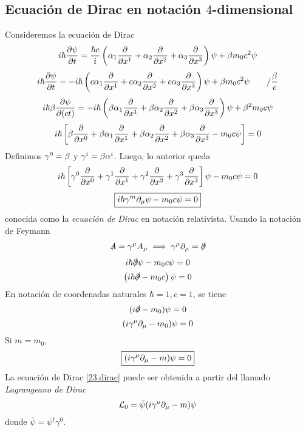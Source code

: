 \subsection{Ecuación de Dirac en notación $4$-dimensional}
Consideremos la ecuación de Dirac
\begin{equation}
  i\hbar\pdv{\psi}{t}=\frac{\hbar c}{i}\left(\alpha_1\pdv{x^1}+\alpha_2\pdv{x^2}+\alpha_3\pdv{x^3}\right)\psi+\beta m_0c^2\psi
\end{equation}
\begin{equation}
  i\hbar\pdv{\psi}{t}=-i\hbar \left(c\alpha_1\pdv{x^1}+c\alpha_2\pdv{x^2}+c\alpha_3\pdv{x^3}\right)\psi+\beta m_0c^2\psi\qquad /\frac{\beta }{c}
\end{equation}
\begin{equation}
  i\hbar\beta\pdv{\psi}{(ct)}=-i\hbar\left(\beta\alpha_1\pdv{x^1}+\beta\alpha_2\pdv{x^2}+\beta\alpha_3\pdv{x^3}\right)\psi+\beta^2m_0c\psi
\end{equation}
\begin{equation}
  i\hbar\left[\beta\pdv{x^0}+\beta\alpha_1\pdv{x^1}+\beta\alpha_2\pdv{x^2}+\beta\alpha_3\pdv{x^3}-m_0c\psi\right]=0
\end{equation}
Definimos $\gamma^0=\beta $ y $\gamma^{i}=\beta\alpha^{i}$. Luego, lo anterior queda
\begin{equation}
  i\hbar\left[\gamma^0\pdv{x^0}+\gamma^1\pdv{x^1}+\gamma^2\pdv{x^2}+\gamma^3\pdv{x^3}\right]\psi-m_0c\psi=0
\end{equation}
\begin{equation}
 \boxed{ i\hbar\gamma^m \partial_\mu \psi-m_0c\psi=0}
\end{equation}
conocida como la \textit{ecuación de Dirac} en notación relativista. Usando la notación de Feymann
\begin{align}
  \slashed{A}=\gamma^\mu A_\mu \implies \gamma^\mu \partial_\mu =\slashed{\partial}
\end{align}
\begin{equation}
  i\hbar\slashed{\partial}\psi-m_0c\psi=0
\end{equation}
\begin{equation}
  \left(i\hbar\slashed{\partial}-m_0c\right)\psi=0
\end{equation}
En notación de coordenadas naturales $\hbar=1,c=1$, se tiene
\begin{equation}
  (i\slashed{\partial}-m_0)\psi=0
\end{equation}
\begin{equation}
  (i\gamma^\mu \partial_\mu -m_0)\psi=0
\end{equation}
Si $m=m_0$,
\begin{equation}\label{23.dirac}
\boxed{  (i\gamma^\mu \partial_\mu -m)\psi=0}
\end{equation}
La ecuación de Dirac \eqref{23.dirac} puede ser obtenida a partir del llamado \textit{Lagrangeano de Dirac}
\begin{equation}\label{23.LagDirac}
  \mathcal{L} _0=\bar{\psi}(i\gamma^\mu \partial_\mu -m)\psi
\end{equation}
donde $\bar{\psi}=\psi^\dagger \gamma^0$.


